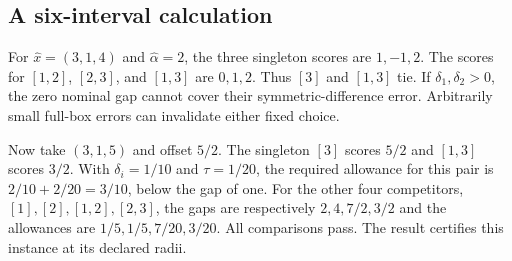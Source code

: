 \subsection{A six-interval calculation}
For $\widehat x=(3,1,4)$ and $\widehat\alpha=2$, the three singleton scores are $1,-1,2$. The scores for $[1,2]$, $[2,3]$, and $[1,3]$ are $0,1,2$. Thus $[3]$ and $[1,3]$ tie. If $\delta_1,\delta_2>0$, the zero nominal gap cannot cover their symmetric-difference error. Arbitrarily small full-box errors can invalidate either fixed choice.

Now take $(3,1,5)$ and offset $5/2$. The singleton $[3]$ scores $5/2$ and $[1,3]$ scores $3/2$. With $\delta_i=1/10$ and $\tau=1/20$, the required allowance for this pair is $2/10+2/20=3/10$, below the gap of one. For the other four competitors, $[1],[2],[1,2],[2,3]$, the gaps are respectively $2,4,7/2,3/2$ and the allowances are $1/5,1/5,7/20,3/20$. All comparisons pass. The result certifies this instance at its declared radii.
